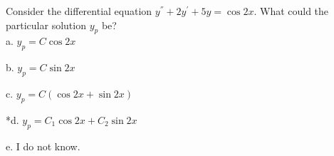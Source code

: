 
Consider the differential equation \( y^{''} + 2y^{'} + 5y = \cos 2x \). What could the particular solution \( y_{p} \) be? \\


a. \( y_{p} = C\cos 2x \)

b. \( y_{p} = C\sin 2x \)

c. \( y_{p} = C ( \cos 2x + \sin 2x ) \)

*d. \( y_{p} = C_{1}\cos 2x + C_{2}\sin 2x \)

e. I do not know. \\
